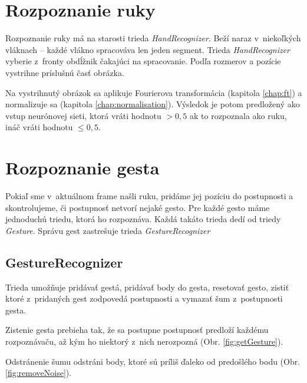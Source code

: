 \section{Rozpoznanie ruky}

Rozpoznanie ruky má na starosti trieda \textit{HandRecognizer}. Beží naraz v~niekoľkých vláknach -- každé vlákno spracováva len jeden segment.
Trieda \textit{HandRecognizer} vyberie z~fronty obdĺžnik čakajúci na spracovanie. Podľa rozmerov a pozície vystrihne príslušnú časť obrázka.

Na vystrihnutý obrázok sa aplikuje Fourierova transformácia (kapitola \ref{chap:ft}) a normalizuje sa (kapitola \ref{chap:normalisation}). Výsledok je potom predložený ako vstup neurónovej sieti, ktorá vráti hodnotu $>0,5$ ak to rozpoznala ako ruku, ináč vráti hodnotu $\leq 0,5$. 	
\eject
\section{Rozpoznanie gesta}
Pokiaľ sme v~aktuálnom frame našli ruku, pridáme jej pozíciu do postupnosti a skontrolujeme, či postupnosť netvorí nejaké gesto. Pre každé gesto máme jednoduchú triedu, ktorá ho rozpoznáva. Každá takáto trieda dedí od triedy \textit{Gesture}. Správu gest zastrešuje trieda \textit{GestureRecognizer}

\subsection{GestureRecognizer}

Trieda umožňuje pridávať gestá, pridávať body do gesta, resetovať gesto, zistiť ktoré z~pridaných gest zodpovedá postupnosti a vymazať šum z~postupnosti gesta.

Zistenie gesta prebieha tak, že sa postupne postupnosť predloží každému rozpoznávaču, až kým ho niektorý z~nich nerozpozná (Obr. \ref{fig:getGesture}).

Odstránenie šumu odstráni body, ktoré sú príliš ďaleko od predošlého bodu (Obr. \ref{fig:removeNoise}). 

